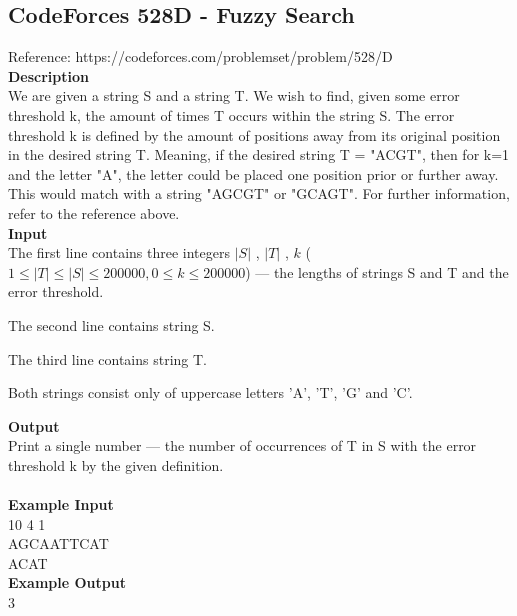 \documentclass{article}
\begin{document}
\subsection{CodeForces 528D - Fuzzy Search}
Reference: https://codeforces.com/problemset/problem/528/D \\
\textbf{Description} \\
We are given a string S and a string T. We wish to find, given some error threshold k, the amount of times T occurs within the string S. The error threshold k is defined by the amount of positions away from its original position in the desired string T. Meaning, if the desired string T = "ACGT", then for k=1 and the letter "A", the letter could be placed one position prior or further away. This would match with a string "AGCGT" or "GCAGT". For further information, refer to the reference above. \\
\textbf{Input} \\
The first line contains three integers $|S|$ , $|T|$ , $k$ ($1 \leq |T| \leq |S| \leq 200 000, 0 \leq k \leq 200000$) — the lengths of strings S and T and the error threshold.

The second line contains string S.

The third line contains string T.

Both strings consist only of uppercase letters 'A', 'T', 'G' and 'C'.

\textbf{Output} \\
Print a single number — the number of occurrences of T in S with the error threshold k by the given definition. \\
\\
\textbf{Example Input} \\
10 4 1 \\
AGCAATTCAT \\
ACAT \\
\textbf{Example Output} \\
3
\end{document}
